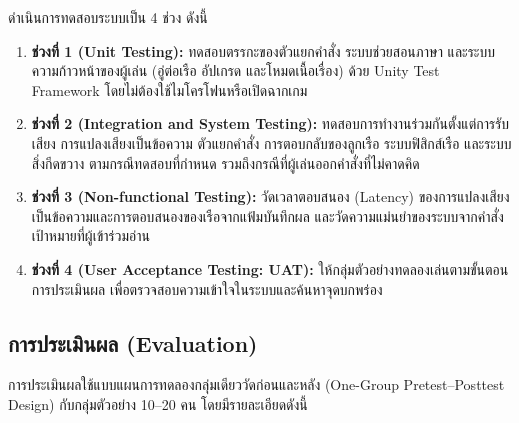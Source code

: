 ดำเนินการทดสอบระบบเป็น 4 ช่วง ดังนี้

\begin{enumerate}[label=(\arabic*)]
    \item \textbf{ช่วงที่ 1 (Unit Testing):} ทดสอบตรรกะของตัวแยกคำสั่ง ระบบช่วยสอนภาษา และระบบความก้าวหน้าของผู้เล่น (อู่ต่อเรือ อัปเกรด และโหมดเนื้อเรื่อง) ด้วย Unity Test Framework โดยไม่ต้องใช้ไมโครโฟนหรือเปิดฉากเกม
    \item \textbf{ช่วงที่ 2 (Integration and System Testing):} ทดสอบการทำงานร่วมกันตั้งแต่การรับเสียง การแปลงเสียงเป็นข้อความ ตัวแยกคำสั่ง การตอบกลับของลูกเรือ ระบบฟิสิกส์เรือ และระบบสิ่งกีดขวาง ตามกรณีทดสอบที่กำหนด รวมถึงกรณีที่ผู้เล่นออกคำสั่งที่ไม่คาดคิด
    \item \textbf{ช่วงที่ 3 (Non-functional Testing):} วัดเวลาตอบสนอง (Latency) ของการแปลงเสียงเป็นข้อความและการตอบสนองของเรือจากแฟ้มบันทึกผล และวัดความแม่นยำของระบบจากคำสั่งเป้าหมายที่ผู้เข้าร่วมอ่าน
    \item \textbf{ช่วงที่ 4 (User Acceptance Testing: UAT):} ให้กลุ่มตัวอย่างทดลองเล่นตามขั้นตอนการประเมินผล เพื่อตรวจสอบความเข้าใจในระบบและค้นหาจุดบกพร่อง
\end{enumerate}

\subsection{การประเมินผล (Evaluation)}

การประเมินผลใช้แบบแผนการทดลองกลุ่มเดียววัดก่อนและหลัง (One-Group Pretest--Posttest Design) กับกลุ่มตัวอย่าง 10--20 คน โดยมีรายละเอียดดังนี้

